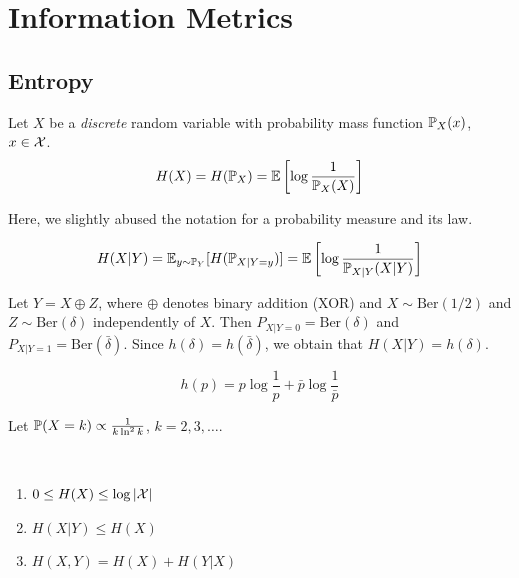\chapter{Information Metrics}

\section{Entropy}

\begin{definition}[Entropy]
    Let $X$ be a \textit{discrete} random variable with probability mass function $\mathbb{P}_X(x)$, $x\in\mathcal{X}$.
    \[H(X)=H(\mathbb{P}_X)=\mathbb{E}\left[\log\frac{1}{\mathbb{P}_X(X)}\right]\]
\end{definition}
Here, we slightly abused the notation for a probability measure and its law.


\begin{definition}
    \[H(X|Y)=\mathbb{E}_{y\sim \mathbb{P}_Y}[H(\mathbb{P}_{X|Y=y})]=\mathbb{E}\left[\log\frac{1}{\mathbb{P}_{X|Y}(X|Y)}\right]\]
\end{definition}

\begin{example}
    Let $Y=X\oplus Z$, where $\oplus$ denotes binary addition (XOR) and $X\sim\text{Ber}(1/2)$ and $Z\sim\text{Ber}(\delta)$ independently of $X$.
    Then $P_{X|Y=0}=\text{Ber}(\delta)$ and $P_{X|Y=1}=\text{Ber}(\bar{\delta})$.
    Since $h(\delta)=h(\bar{\delta})$, we obtain that $H(X|Y)=h(\delta)$.
\end{example}

\begin{example}
    \[h(p)=p\log\frac{1}{p}+\bar{p}\log\frac{1}{\bar{p}}\]
\end{example}

\begin{example}
    Let $\mathbb{P}(X=k)\propto \frac{1}{k\ln^2k}$, $k=2,3,\dots$.
\end{example}

\begin{proposition}
    \
    \begin{enumerate}[label=(\roman*)]
        \item $0\leq H(X)\leq \log|\mathcal{X}|$
        \item $H(X|Y)\leq H(X)$
        \item $H(X,Y)=H(X)+H(Y|X)$
    \end{enumerate}
\end{proposition}

